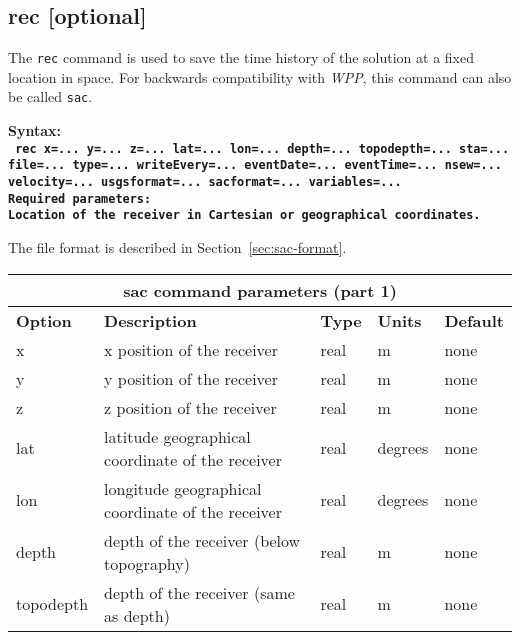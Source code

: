 \documentclass[11pt]{report}
\begin{document}
\subsection{rec [optional]}
The \verb+rec+ command is used to save the time history of the solution at a fixed
location in space. For backwards compatibility with \emph{WPP}, this command can also be called
\verb+sac+.
\begin{flushleft}
\bf
Syntax:\\
\tt
rec x=... y=... z=... lat=... lon=... depth=... topodepth=... sta=... file=... type=... writeEvery=... eventDate=... eventTime=... nsew=... velocity=... usgsformat=... sacformat=... variables=...
\\
\bf Required parameters:\\
\rm Location of the receiver in Cartesian or geographical coordinates.
\end{flushleft}
%
The file format is described in Section~\ref{sec:sac-format}.
%
\begin{center}
\begin{tabular}{|l|p{8cm}|l|l|l|} \hline
\multicolumn{5}{|c|}{\bf sac command parameters (part 1)}\\ \hline
\bf{Option} & \bf{Description} & \bf{Type} & \bf{Units} & \bf{Default} \\ \hline \hline
x & x position of the receiver & real & m & none \\ \hline
y & y position of the receiver & real & m & none \\ \hline
z & z position of the receiver & real & m & none \\ \hline
\hline
lat & latitude geographical coordinate of the receiver & real & degrees & none \\ \hline
lon & longitude geographical coordinate of the receiver & real & degrees & none \\ \hline
depth & depth of the receiver (below topography) & real & m & none \\ \hline
topodepth & depth of the receiver (same as depth) & real & m & none \\ \hline
\end{tabular}
\end{center}
\end{document}
